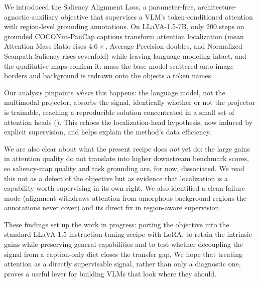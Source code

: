 We introduced the Saliency Alignment Loss, a parameter-free, architecture-agnostic auxiliary objective that supervises a VLM's token-conditioned attention with region-level grounding annotations. On LLaVA-1.5-7B, only $200$ steps on grounded COCONut-PanCap captions transform attention localization (mean Attention Mass Ratio rises $4.6{\times}$, Average Precision doubles, and Normalized Scanpath Saliency rises sevenfold) while leaving language modeling intact, and the qualitative maps confirm it: mass the base model scattered onto image borders and background is redrawn onto the objects a token names.

Our analysis pinpoints \emph{where} this happens: the language model, not the multimodal projector, absorbs the signal, identically whether or not the projector is trainable, reaching a reproducible solution concentrated in a small set of attention heads (). This echoes the localization-head hypothesis, now induced by explicit supervision, and helps explain the method's data efficiency.

We are also clear about what the present recipe does \emph{not} yet do: the large gains in attention quality do not translate into higher downstream benchmark scores, so saliency-map quality and task grounding are, for now, dissociated. We read this not as a defect of the objective but as evidence that localization is a capability worth supervising in its own right. We also identified a clean failure mode (alignment withdraws attention from amorphous background regions the annotations never cover) and its direct fix in region-aware supervision.

These findings set up the work in progress: porting the objective into the standard LLaVA-1.5 instruction-tuning recipe with LoRA, to retain the intrinsic gains while preserving general capabilities and to test whether decoupling the signal from a caption-only diet closes the transfer gap. We hope that treating attention as a directly supervisable signal, rather than only a diagnostic one, proves a useful lever for building VLMs that look where they should.
